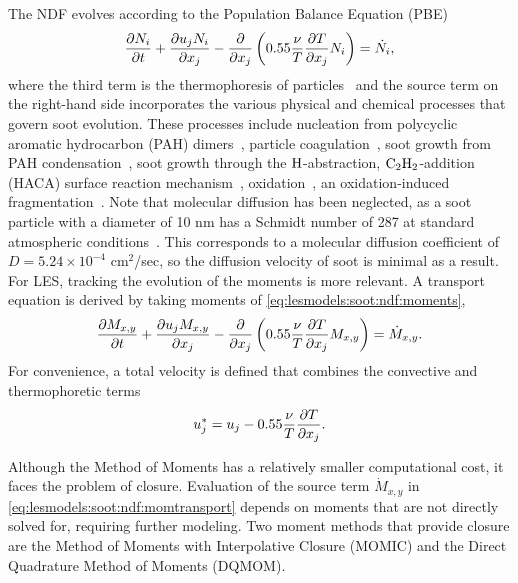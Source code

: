 The NDF evolves according to the Population Balance Equation (PBE)~\cite{friedlander2000}
\begin{equation}\label{eq:lesmodels:soot:ndf:pbe}
  \tder{N_i} - \pder[]{x_j}\left( 0.55\frac{\nu}{T}\pder[T]{x_j}N_i \right) = \dot{N_i},
\end{equation}
where the third term is the thermophoresis of particles~\cite{waldmann1966} and the source term on the right-hand side incorporates the various physical and chemical processes that govern soot evolution. These processes include nucleation from polycyclic aromatic hydrocarbon (PAH) dimers~\cite{blanquart2009,schuetz2002,frenklach1991,wang2011}, particle coagulation~\cite{kazakov1998,hmom2009}, soot growth from PAH condensation~\cite{blanquart2009,hmom2009}, soot growth through the $\ce{H}$-abstraction, $\ce{C2H2}$-addition (HACA) surface reaction mechanism~\cite{frenklach1985,frenklach1991}, oxidation~\cite{stanmore2001,neoh1981,kazakov1995}, an oxidation-induced fragmentation~\cite{neoh1984,mueller2011}. Note that molecular diffusion has been neglected, as a soot particle with a diameter of 10 nm has a Schmidt number of 287 at standard atmospheric conditions~\cite{friedlander2000}. This corresponds to a molecular diffusion coefficient of $D = 5.24\times 10^{-4}$ cm$^2$/sec, so the diffusion velocity of soot is minimal as a result. For LES, tracking the evolution of the moments is more relevant. A transport equation is derived by taking moments of \cref{eq:lesmodels:soot:ndf:moments},
\begin{equation}\label{eq:lesmodels:soot:ndf:momtransport}
  \tder{M_{x,y}} - \pder[]{x_j}\left( 0.55\frac{\nu}{T}\pder[T]{x_j}M_{x,y} \right) = \dot{M}_{x,y}.
\end{equation}
For convenience, a total velocity is defined that combines the convective and thermophoretic terms
\begin{equation}\label{eq:lesmodels:soot:ndf:totvel}
  u_j^* = u_j - 0.55\frac{\nu}{T}\pder[T]{x_j}.
\end{equation}

Although the Method of Moments has a relatively smaller computational cost, it faces the problem of closure. Evaluation of the source term $\dot{M}_{x,y}$ in \cref{eq:lesmodels:soot:ndf:momtransport} depends on moments that are not directly solved for, requiring further modeling. Two moment methods that provide closure are the Method of Moments with Interpolative Closure (MOMIC) and the Direct Quadrature Method of Moments (DQMOM).

